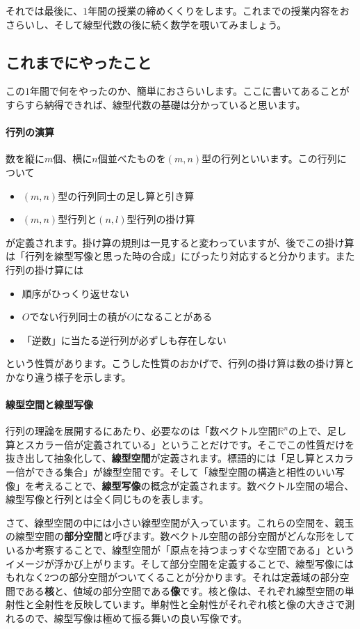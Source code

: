 それでは最後に、$1$年間の授業の締めくくりをします。これまでの授業内容をおさらいし、そして線型代数の後に続く数学を覗いてみましょう。

\subsection{これまでにやったこと}

この$1$年間で何をやったのか、簡単におさらいします。ここに書いてあることがすらすら納得できれば、線型代数の基礎は分かっていると思います。

\paragraph{行列の演算}

数を縦に$m$個、横に$n$個並べたものを$(m, n)$型の行列といいます。この行列について
\begin{itemize}
\item $(m, n)$型の行列同士の足し算と引き算
\item $(m, n)$型行列と$(n, l)$型行列の掛け算
\end{itemize}
が定義されます。掛け算の規則は一見すると変わっていますが、後でこの掛け算は「行列を線型写像と思った時の合成」にぴったり対応すると分かります。また行列の掛け算には
\begin{itemize}
\item 順序がひっくり返せない
\item $O$でない行列同士の積が$O$になることがある
\item 「逆数」に当たる逆行列が必ずしも存在しない
\end{itemize}
という性質があります。こうした性質のおかげで、行列の掛け算は数の掛け算とかなり違う様子を示します。

\paragraph{線型空間と線型写像}

行列の理論を展開するにあたり、必要なのは「数ベクトル空間$\mathbb{R}^n$の上で、足し算とスカラー倍が定義されている」ということだけです。そこでこの性質だけを抜き出して抽象化して、\textbf{線型空間}が定義されます。標語的には「足し算とスカラー倍ができる集合」が線型空間です。そして「線型空間の構造と相性のいい写像」を考えることで、\textbf{線型写像}の概念が定義されます。数ベクトル空間の場合、線型写像と行列とは全く同じものを表します。

さて、線型空間の中には小さい線型空間が入っています。これらの空間を、親玉の線型空間の\textbf{部分空間}と呼びます。数ベクトル空間の部分空間がどんな形をしているか考察することで、線型空間が「原点を持つまっすぐな空間である」というイメージが浮かび上がります。そして部分空間を定義することで、線型写像にはもれなく$2$つの部分空間がついてくることが分かります。それは定義域の部分空間である\textbf{核}と、値域の部分空間である\textbf{像}です。核と像は、それぞれ線型空間の単射性と全射性を反映しています。単射性と全射性がそれぞれ核と像の大きさで測れるので、線型写像は極めて振る舞いの良い写像です。

